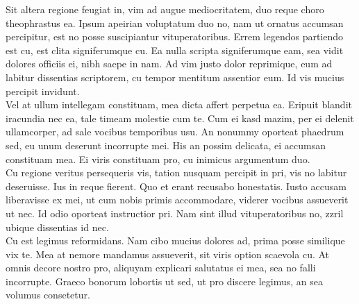 Sit altera regione feugiat in, vim ad augue mediocritatem, duo reque choro theophrastus ea. Ipsum apeirian voluptatum duo no, nam ut ornatus accumsan percipitur, est no posse suscipiantur vituperatoribus. Errem legendos partiendo est cu, est clita signiferumque cu. Ea nulla scripta signiferumque eam, sea vidit dolores officiis ei, nibh saepe in nam. Ad vim justo dolor reprimique, eum ad labitur dissentias scriptorem, cu tempor mentitum assentior eum. Id vis mucius percipit invidunt.\\

Vel at ullum intellegam constituam, mea dicta affert perpetua ea. Eripuit blandit iracundia nec ea, tale timeam molestie cum te. Cum ei kasd mazim, per ei delenit ullamcorper, ad sale vocibus temporibus usu. An nonummy oporteat phaedrum sed, eu unum deserunt incorrupte mei. His an possim delicata, ei accumsan constituam mea. Ei viris constituam pro, cu inimicus argumentum duo.\\

Cu regione veritus persequeris vis, tation nusquam percipit in pri, vis no labitur deseruisse. Ius in reque fierent. Quo et erant recusabo honestatis. Iusto accusam liberavisse ex mei, ut cum nobis primis accommodare, viderer vocibus assueverit ut nec. Id odio oporteat instructior pri. Nam sint illud vituperatoribus no, zzril ubique dissentias id nec.\\

Cu est legimus reformidans. Nam cibo mucius dolores ad, prima posse similique vix te. Mea at nemore mandamus assueverit, sit viris option scaevola cu. At omnis decore nostro pro, aliquyam explicari salutatus ei mea, sea no falli incorrupte. Graeco bonorum lobortis ut sed, ut pro discere legimus, an sea volumus consetetur.\\